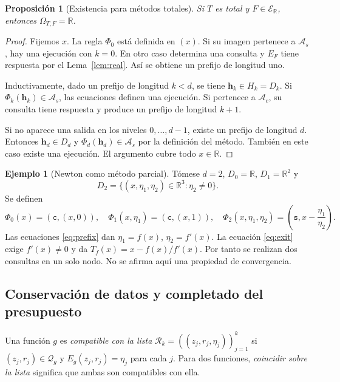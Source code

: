 \documentclass[11pt,a4paper]{article}
\numberwithin{equation}{section}
\newtheorem{proposition}[theorem]{Proposición}
\theoremstyle{definition}
\newtheorem{example}[theorem]{Ejemplo}
\theoremstyle{remark}
\newcommand{\R}{\mathbb R}
\newcommand{\ER}{\mathcal E_{\R}}
\newcommand{\QQ}{\mathcal Q}
\newcommand{\Rec}{\mathcal R}
\newcommand{\hc}{\mathbf h}
\newcommand{\ct}{\mathtt c}
\newcommand{\st}{\mathtt s}
\begin{document}
\begin{proposition}[Existencia para métodos totales]\label{prop:total}
Si $T$ es total y $F\in\ER$, entonces $\Omega_{T,F}=\R$.
\end{proposition}
\begin{proof}
Fijemos $x$. La regla $\Phi_0$ está definida en $(x)$. Si su imagen pertenece a $\mathcal A_s$, hay una ejecución con $k=0$. En otro caso determina una consulta y $E_F$ tiene respuesta por el Lema~\ref{lem:real}. Así se obtiene un prefijo de longitud uno.

Inductivamente, dado un prefijo de longitud $k<d$, se tiene $\hc_k\in H_k=D_k$. Si $\Phi_k(\hc_k)\in\mathcal A_s$, las ecuaciones definen una ejecución. Si pertenece a $\mathcal A_c$, su consulta tiene respuesta y produce un prefijo de longitud $k+1$.

Si no aparece una salida en los niveles $0,\ldots,d-1$, existe un prefijo de longitud $d$. Entonces $\hc_d\in D_d$ y $\Phi_d(\hc_d)\in\mathcal A_s$ por la definición del método. También en este caso existe una ejecución. El argumento cubre todo $x\in\R$.
\end{proof}

\begin{example}[Newton como método parcial]\label{ex:newton}
Tómese $d=2$, $D_0=\R$, $D_1=\R^2$ y
\[
D_2=\{(x,\eta_1,\eta_2)\in\R^3:\eta_2\ne0\}.
\]
Se definen
\[
\Phi_0(x)=(\ct,(x,0)),\quad
\Phi_1(x,\eta_1)=(\ct,(x,1)),\quad
\Phi_2(x,\eta_1,\eta_2)=\left(\st,x-\frac{\eta_1}{\eta_2}\right).
\]
Las ecuaciones \eqref{eq:prefix} dan $\eta_1=f(x)$, $\eta_2=f'(x)$. La ecuación \eqref{eq:exit} exige $f'(x)\ne0$ y da $T_f(x)=x-f(x)/f'(x)$. Por tanto se realizan dos consultas en un solo nodo. No se afirma aquí una propiedad de convergencia.
\end{example}

\subsection{Conservación de datos y completado del presupuesto}
Una función $g$ es \emph{compatible con la lista} $\Rec_k=((z_j,r_j,\eta_j))_{j=1}^k$ si $(z_j,r_j)\in\QQ_g$ y $E_g(z_j,r_j)=\eta_j$ para cada $j$. Para dos funciones, \emph{coincidir sobre la lista} significa que ambas son compatibles con ella.
\end{document}
